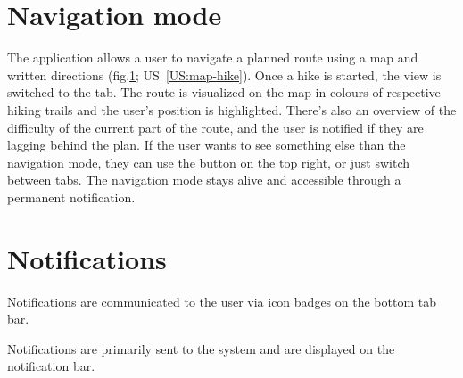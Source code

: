 \section{Navigation mode}
The application allows a user to navigate a planned route using a map and written directions (fig.\ref{fig:navigation}; US~\ref{US:map-hike}).
Once a hike is started, the view is switched to the  tab.
The route is visualized on the map in colours of respective hiking trails and the user's position is highlighted.
There's also an overview of the difficulty of the current part of the route, and the user is notified if they are lagging behind the plan.
If the user wants to see something else than the navigation mode, they can use the  button on the top right, or just switch between tabs.
The navigation mode stays alive and accessible through a permanent notification.

\begin{figure}[h!]
    \centering
    \label{fig:navigation}
\end{figure}

\section{Notifications}
Notifications are communicated to the user via icon badges on the bottom tab bar.

Notifications are primarily sent to the system and are displayed on the notification bar.

